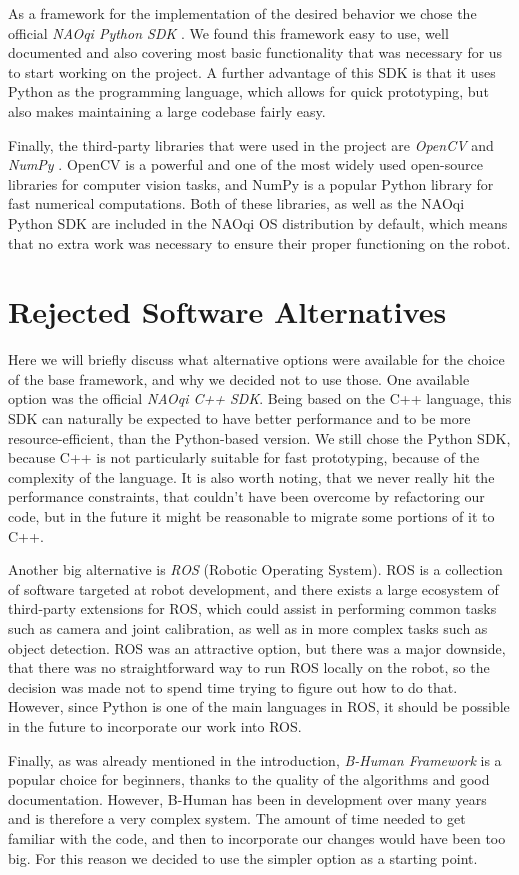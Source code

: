 As a framework for the implementation of the desired behavior we chose the
official \textit{NAOqi Python SDK} \cite{naoqi-sdk}. We found this framework
easy to use, well documented and also covering most basic functionality that
was necessary for us to start working on the project. A further advantage of
this SDK is that it uses Python as the programming language, which allows for
quick prototyping, but also makes maintaining a large codebase fairly easy.

Finally, the third-party libraries that were used in the project are
\textit{OpenCV} and \textit{NumPy} \cite{opencv, numpy}. OpenCV is a powerful
and one of the most widely used open-source libraries for computer vision
tasks, and NumPy is a popular Python library for fast numerical computations.
Both of these libraries, as well as the NAOqi Python SDK are included in the
NAOqi OS distribution by default, which means that no extra work was necessary
to ensure their proper functioning on the robot.

\section{Rejected Software Alternatives}

Here we will briefly discuss what alternative options were available for the
choice of the base framework, and why we decided not to use those. One
available option was the official \textit{NAOqi C++ SDK}. Being based on the
C++ language, this SDK can naturally be expected to have better performance and to be more resource-efficient, than the Python-based version. We still chose the
Python SDK, because C++ is not particularly suitable for fast prototyping,
because of the complexity of the language. It is also worth noting, that we
never really hit the performance constraints, that couldn't have been overcome
by refactoring our code, but in the future it might be reasonable to migrate
some portions of it to C++.

Another big alternative is \textit{ROS} \cite{ros} (Robotic Operating System).
ROS is a collection of software targeted at robot development, and there exists
a large ecosystem of third-party extensions for ROS, which could assist in
performing common tasks such as camera and joint calibration, as well as in
more complex tasks such as object detection. ROS was an attractive option, but
there was a major downside, that there was no straightforward way to run ROS
locally on the robot, so the decision was made not to spend time trying to
figure out how to do that. However, since Python is one of the main languages
in ROS, it should be possible in the future to incorporate our work into ROS.

Finally, as was already mentioned in the introduction, \textit{B-Human
  Framework} is a popular choice for beginners, thanks to the quality of the
algorithms and good documentation. However, B-Human has been in development
over many years and is therefore a very complex system. The amount of time needed
to get familiar with the code, and then to incorporate our changes would have
been too big. For this reason we decided to use the simpler option as a
starting point.
